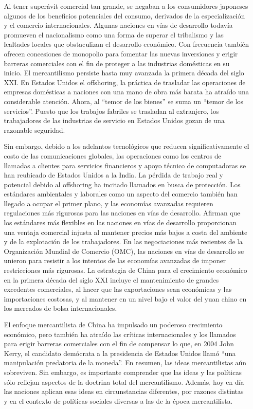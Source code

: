 \documentclass[
  jou,
  floatsintext,
  longtable,
  a4paper,
  nolmodern,
  notxfonts,
  notimes,
  colorlinks=true,linkcolor=blue,citecolor=blue,urlcolor=blue]{apa7}
\begin{document}
Al tener superávit comercial tan grande, se negaban a los consumidores
japoneses algunos de los beneficios potenciales del consumo, derivados
de la especialización y el comercio internacionales. Algunas naciones en
vías de desarrollo todavía promueven el nacionalismo como una forma de
superar el tribalismo y las lealtades locales que obstaculizan el
desarrollo económico. Con frecuencia también ofrecen concesiones de
monopolio para fomentar las nuevas inversiones y erigir barreras
comerciales con el fin de proteger a las industrias domésticas en su
inicio. El mercantilismo persiste hasta muy avanzada la primera década
del siglo XXI. En Estados Unidos el offshoring, la práctica de trasladar
las operaciones de empresas domésticas a naciones con una mano de obra
más barata ha atraído una considerable atención. Ahora, al ``temor de
los bienes'' se suma un ``temor de los servicios''. Puesto que los
trabajos fabriles se trasladan al extranjero, los trabajadores de las
industrias de servicio en Estados Unidos gozan de una razonable
seguridad.

Sin embargo, debido a los adelantos tecnológicos que reducen
significativamente el costo de las comunicaciones globales, las
operaciones como los centros de llamadas a clientes para servicios
financieros y apoyo técnico de computadoras se han reubicado de Estados
Unidos a la India. La pérdida de trabajo real y potencial debido al
offshoring ha incitado llamados en busca de protección. Los estándares
ambientales y laborales como un aspecto del comercio también han llegado
a ocupar el primer plano, y las economías avanzadas requieren
regulaciones más rigurosas para las naciones en vías de desarrollo.
Afirman que los estándares más flexibles en las naciones en vías de
desarrollo proporcionan una ventaja comercial injusta al mantener
precios más bajos a costa del ambiente y de la explotación de los
trabajadores. En las negociaciones más recientes de la Organización
Mundial de Comercio (OMC), las naciones en vías de desarrollo se unieron
para resistir a los intentos de las economías avanzadas de imponer
restricciones más rigurosas. La estrategia de China para el crecimiento
económico en la primera década del siglo XXI incluye el mantenimiento de
grandes excedentes comerciales, al hacer que las exportaciones sean
económicas y las importaciones costosas, y al mantener en un nivel bajo
el valor del yuan chino en los mercados de bolsa internacionales.

El enfoque mercantilista de China ha impulsado un poderoso crecimiento
económico, pero también ha atraído las críticas internacionales y los
llamados para erigir barreras comerciales con el fin de compensar lo
que, en 2004 John Kerry, el candidato demócrata a la presidencia de
Estados Unidos llamó ``una manipulación predatoria de la moneda''. En
resumen, las ideas mercantilistas aún sobreviven. Sin embargo, es
importante comprender que las ideas y las políticas sólo reflejan
aspectos de la doctrina total del mercantilismo. Además, hoy en día las
naciones aplican esas ideas en circunstancias diferentes, por razones
distintas y en el contexto de políticas sociales diversas a las de la
época mercantilista.
\end{document}

